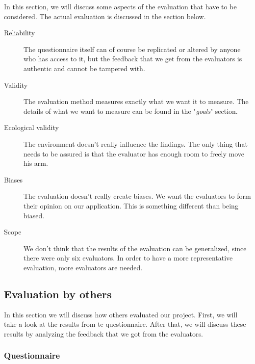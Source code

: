 \documentclass{article}
\begin{document}
In this section, we will discuss some aspects of the evaluation that have to be considered. The actual evaluation is discussed in the section below. 
\begin{description}
\item[Reliability] The questionnaire itself can of course be replicated or altered by anyone who has access to it, but the feedback that we get from the evaluators is authentic and cannot be tampered with.
\item[Validity] The evaluation method measures exactly what we want it to measure. The details of what we want to measure can be found in the "\textit{goals}" section.
\item[Ecological validity] The environment doesn't really influence the findings. The only thing that needs to be assured is that the evaluator has enough room to freely move his arm.
\item[Biases] The evaluation doesn't really create biases. We want the evaluators to form their opinion on our application. This is something different than being biased.
\item[Scope] We don't think that the results of the evaluation can be generalized, since there were only six evaluators. In order to have a more representative evaluation, more evaluators are needed.
\end{description}

\subsection{Evaluation by others}
In this section we will discuss how others evaluated our project. First, we will take a look at the results from te questionnaire. After that, we will discuss these results by analyzing the feedback that we got from the evaluators.
\subsubsection{Questionnaire}
\end{document}
